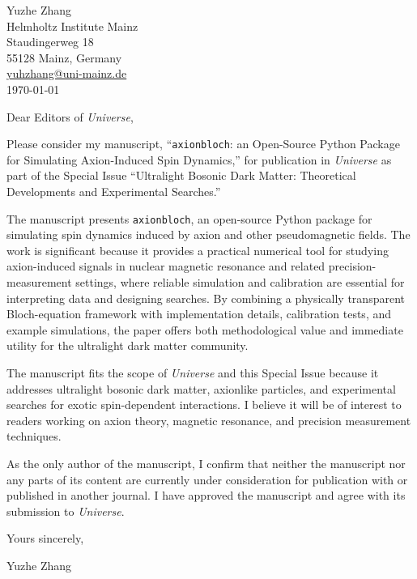 \documentclass[11pt,a4paper]{article}
\newcommand{\axionbloch}{\texttt{axionbloch}}
\begin{document}
\begin{flushright}
Yuzhe Zhang \\
Helmholtz Institute Mainz \\
Staudingerweg 18 \\
55128 Mainz, Germany \\
\href{mailto:yuhzhang@uni-mainz.de}{yuhzhang@uni-mainz.de} \\
\today
\end{flushright}

Dear Editors of \textit{Universe},

Please consider my manuscript, ``\axionbloch: an Open-Source Python Package for Simulating Axion-Induced Spin Dynamics,'' for publication in \textit{Universe} as part of the Special Issue ``Ultralight Bosonic Dark Matter: Theoretical Developments and Experimental Searches.''

The manuscript presents \axionbloch{}, an open-source Python package for simulating spin dynamics induced by axion and other pseudomagnetic fields. The work is significant because it provides a practical numerical tool for studying axion-induced signals in nuclear magnetic resonance and related precision-measurement settings, where reliable simulation and calibration are essential for interpreting data and designing searches. By combining a physically transparent Bloch-equation framework with implementation details, calibration tests, and example simulations, the paper offers both methodological value and immediate utility for the ultralight dark matter community.

The manuscript fits the scope of \textit{Universe} and this Special Issue because it addresses ultralight bosonic dark matter, axionlike particles, and experimental searches for exotic spin-dependent interactions. I believe it will be of interest to readers working on axion theory, magnetic resonance, and precision measurement techniques.

As the only author of the manuscript, I confirm that neither the manuscript nor any parts of its content are currently under consideration for publication with or published in another journal.
I have approved the manuscript and agree with its submission to \textit{Universe}.

\vspace{1.5em}

\noindent Yours sincerely,

\noindent Yuzhe Zhang
\end{document}

